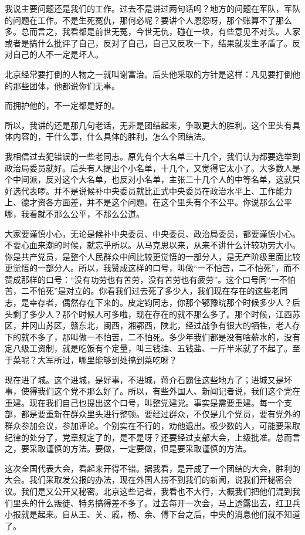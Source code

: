 我说主要问题还是我们的工作。过去不是讲过两句话吗？地方的问题在军队，军队的问题在工作。不是生死冤仇，那何必呢？要讲个人恩怨呀，那个账算不了那么多。总而言之，我看都是前世无冤，今世无仇，碰在一块，有些意见不对头。人家或者是搞什么批评了自己，反对了自己，自己又反攻一下，结果就发生矛盾了。反对自己的人不一定是坏人。

北京经常要打倒的人物之一就叫谢富治。后头他采取的方针是这样：凡见要打倒他的那些团体，他都说你们无事。

而拥护他的，不一定都是好的。

所以，我讲的还是那几句老话，无非是团结起来，争取更大的胜利。这个里头有具体内容的，干什么事，什么具体的胜利，怎么个团结法。

我相信过去犯错误的一些老同志。原先有个大名单三十几个，我们认为都要选举到政治局委员就好。后头有人提出个小名单，十几个，又觉得它太小了。大多数人是个中间派，反对这个大名单，也反对小名单，主张二十几个人的中等名单，这就只好选代表啰。并不是说候补中央委员就比正式中央委员在政治水平上、工作能力上、德才资各方面差，并不是这个问题。在这个里头有个不公平。你说那么公平哪，我看就不那么公平，不那么公道。

大家要谨慎小心，无论是候补中央委员、中央委员、政治局委员，都要谨慎小心。不要心血来潮的时候，就忘乎所以。从马克思以来，从来不讲什么计较功劳大小。你是共产党员，是整个人民群众中间比较更觉悟的一部分人，是无产阶级里面比较更觉悟的一部分人。所以，我赞成这样的口号，叫做“一不怕苦，二不怕死”，而不赞成那样的口号：“没有功劳也有苦劳，没有苦劳也有疲劳”。这个口号同“一不怕苦，二不怕死”是对立的。你看我们过去死了多少人，我们现在存在的这些老同志，是幸存者，偶然存在下来的。皮定钧同志，你那个鄂豫皖那个时候多少人？后头剩了多少人？那个时候人可多啦，现在存在的就不那么多了。那个时候，江西苏区，井冈山苏区，赣东北，闽西，湘鄂西，陕北，经过战争有很大的牺牲，老人存下的就不多了，那叫做一不怕苦，二不怕死。多少年我们都是没有啥薪水的，没有定八级工资制，就是吃饭有个定量，叫三钱油、五钱盐、一斤半米就了不起了。至于菜呢？大军所过，哪里能够到处搞到菜吃呀？

现在进了城。这个进城，是好事，不进城，蒋介石霸住这些地方了；进城又是坏事，使得我们这个党不那么好了。所以，有些外国人、新闻记者说，我们这个党在重建。现在我们自己也提出这个口号，叫整党建党。事实是需要重建。每一个支部，都是要重新在群众里头进行整顿。要经过群众，不仅是几个党员，要有党外的群众参加会议，参加评论。个别实在不行的，劝他退出。极少数的人，可能要采取纪律的处分了，党章规定了的，是不是呀？还要经过支部大会，上级批准。总而言之，要采取谨慎的方法。要做，一定要做，但是要采取谨慎的方法。

这次全国代表大会，看起来开得不错。据我看，是开成了一个团结的大会，胜利的大会。我们采取发公报的办法，现在外国人捞不到我们的新闻，说我们开秘密会议。我们是又公开又秘密。北京这些记者，我看也不大行，大概我们把他们混到我们里头的什么叛徒、特务搞得差不多了。过去每开一次会，马上透露出去，红卫兵小报就是起来。自从王、关、戚，杨、余、傅下台之后，中央的消息他们就不知道了。

